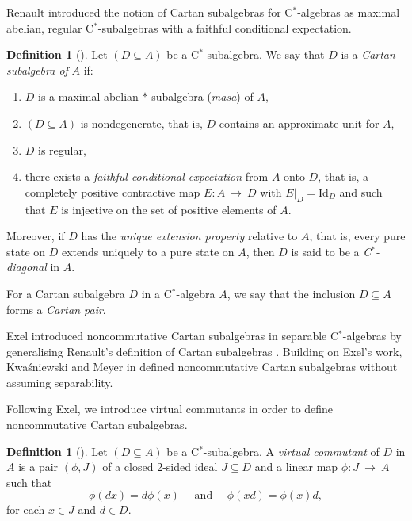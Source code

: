 \documentclass[a4paper]{amsart}
\newcommand{\myhyp}{\textnormal{-}\hskip0pt\relax}
\numberwithin{equation}{section}
\newcommand{\cstar}{C$^\ast$\myhyp{}algebra}
\newcommand{\cstarSub}{C$^\ast$\myhyp{}subalgebra}
\newcommand{\cstarDiag}{C$^\ast$\myhyp{}diagonal}
\newcommand{\rAr}{\longrightarrow}
\theoremstyle{plain}
\theoremstyle{indented}
\numberwithin{equation}{section}
\theoremstyle{definition}
\newtheorem{defin}[thm]{Definition}
\theoremstyle{remark}
\theoremstyle{plain}
\theoremstyle{definition}
\begin{document}
Renault introduced the notion of Cartan subalgebras for \cstar{}s as maximal abelian, 
regular \cstarSub{}s with a faithful conditional expectation. 

\begin{defin}[{\cite{Renault2008cartanSub}}] \label{def:Cartan}
    Let ${(D \subseteq A)}$ be a \cstarSub{}. We say that $D$ is a \emph{Cartan subalgebra of} $A$ if:
    \begin{enumerate}\renewcommand{\labelenumi}{(\arabic{enumi})}
        \item $D$ is a maximal abelian $\ast$\myhyp{}subalgebra (\emph{masa}) of $A$,
        \item ${(D \subseteq A)}$ is nondegenerate, that is, $D$ contains an approximate unit for $A$,
        \item $D$ is regular,
        \item there exists a \emph{faithful conditional expectation} from $A$ onto $D$,
        that is, a completely positive contractive map ${E \colon A~\rAr~D}$
        with ${E|_D = \mathrm{Id}_D}$ and such that $E$ is injective on the set of positive elements of $A$.
    \end{enumerate}
    Moreover, if $D$ has the \emph{unique extension property} relative to $A$, that is,
    every pure state on $D$ extends uniquely to a pure state on $A$, then $D$ is said to be a \emph{\cstarDiag{}} in $A$.

    For a Cartan subalgebra $D$ in a \cstar{} $A$, we say that the inclusion ${D\subseteq A}$ forms a \emph{Cartan pair}.
\end{defin}

Exel {\cite{Exel2011noncommCartan}} introduced noncommutative Cartan subalgebras  
in separable \cstar{}s by generalising Renault's definition of Cartan subalgebras \cite{Renault2008cartanSub}. 
Building on Exel's work, Kwa\'{s}niewski and Meyer in \cite{KwasniewskiMeyer2020NoncommutativeCartan}
defined noncommutative Cartan subalgebras
without assuming separability.

Following Exel, we introduce virtual commutants in order to define noncommutative Cartan subalgebras.

\begin{defin}[{\cite{Exel2011noncommCartan}}]
    Let ${(D \subseteq A)}$ be a \cstarSub{}. 
    A \emph{virtual commutant} of $D$ in $A$ is a pair
    ${(\phi, J)}$ of a 
    closed
    2\myhyp{}sided ideal ${J \subseteq D}$
    and a linear map ${\phi \colon J~\rAr~A}$ such that
    \begin{equation*}
        \phi(d x) = d \phi(x) 
        \phantom{=} \text{and} \phantom{=}
        \phi(x d) = \phi(x) d,
    \end{equation*}
    for each $x \in J$ and $d \in D$.
\end{defin}
\end{document}
